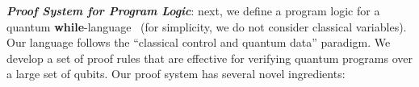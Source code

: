\documentclass[conference,compsoc, 10pt]{IEEEtran}
\begin{document}
	
  \textbf{\emph{Proof System for Program Logic}}: next, we define a
  program logic for a quantum \textbf{while}-language~\cite{Ying11}
  (for simplicity, we do not consider classical variables). Our
  language follows the ``classical control and quantum data'' 
  paradigm. We develop a set of proof rules that are effective for
  verifying quantum programs over a large set of qubits. Our proof
  system has several novel ingredients:
	\begin{enumerate}
		

\end{enumerate}
\end{document}

